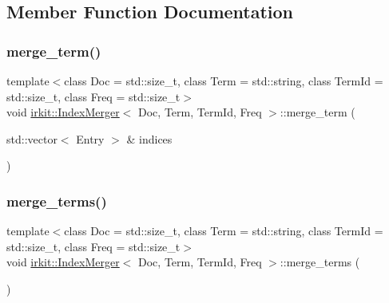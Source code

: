 \subsection{Member Function Documentation}
\mbox{\label{classirkit_1_1IndexMerger_aabfc3277d370138aa02a8ee48da810db}} 
\subsubsection{\texorpdfstring{merge\+\_\+term()}{merge\_term()}}
{\footnotesize\ttfamily template$<$class Doc  = std\+::size\+\_\+t, class Term  = std\+::string, class Term\+Id  = std\+::size\+\_\+t, class Freq  = std\+::size\+\_\+t$>$ \\
void \hyperlink{classirkit_1_1IndexMerger}{irkit\+::\+Index\+Merger}$<$ Doc, Term, Term\+Id, Freq $>$\+::merge\+\_\+term (\begin{DoxyParamCaption}\item[{std\+::vector$<$ Entry $>$ \&}]{indices }\end{DoxyParamCaption})\hspace{0.3cm}{\ttfamily [inline]}}

\mbox{\label{classirkit_1_1IndexMerger_a1dcf1ca9ee8faa142b9d38bde59757fa}} 
\subsubsection{\texorpdfstring{merge\+\_\+terms()}{merge\_terms()}}
{\footnotesize\ttfamily template$<$class Doc  = std\+::size\+\_\+t, class Term  = std\+::string, class Term\+Id  = std\+::size\+\_\+t, class Freq  = std\+::size\+\_\+t$>$ \\
void \hyperlink{classirkit_1_1IndexMerger}{irkit\+::\+Index\+Merger}$<$ Doc, Term, Term\+Id, Freq $>$\+::merge\+\_\+terms (\begin{DoxyParamCaption}{ }\end{DoxyParamCaption})\hspace{0.3cm}{\ttfamily [inline]}}

\mbox{\label{classirkit_1_1IndexMerger_a7c510436b6dbc5999404e2f8dd1818b7}} 
